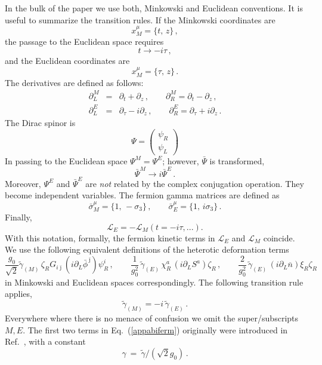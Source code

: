 \documentclass[epsfig,12pt]{article}
\def\beq{\begin{equation}}
\def\eeq{\end{equation}}
\def\beqn{\begin{eqnarray}}
\def\eeqn{\end{eqnarray}}
\newcommand{\cell}{{\mathcal L}}
\newcommand{\pt}{\partial}
\def\beqn{\begin{eqnarray}}
\def\eeqn{\end{eqnarray}}
\def\beq{\begin{equation}}
\def\eeq{\end{equation}}
\newcommand{\p}{\partial}
\newcommand{\wt}{\widetilde}
\newcommand{\ov}{\overline}
\newcommand{\bj}{{\bar \jmath}}
\newcommand{\ssm}{{\scriptscriptstyle(M)}}
\newcommand{\sse}{{\scriptscriptstyle(E)}}
\begin{document}
{In the bulk of the paper we use both, Minkowski and Euclidean conventions.
It is useful to summarize the transition rules.
If the Minkowski coordinates are
\beq
x^\mu_M =\{t,\,z\}\,,
\label{appeone}
\eeq
the passage to the Euclidean space requires
\beq
t \to - i\tau\,,
\label{appe2}
\eeq
and the Euclidean coordinates are
\beq
x^\mu_M =\{\tau,\,z\}\,.
\label{appe3}
\eeq
The derivatives are defined as follows:
\beqn
\pt_L^M &=& \pt_t+\pt_z\,,\qquad \pt_R^M = \pt_t- \pt_z\,,
\nonumber\\[2mm]
\pt_L^E &=& \pt_\tau - i \pt_z\,,\qquad \pt_R^E = \pt_\tau + i \pt_z\,.
\label{appe4}
\eeqn
The Dirac spinor is
\beq
\Psi =\left(
\begin{array}{c}
\psi_R\\[1mm]
\psi_L
\end{array}
\right)
\label{appe5}
\eeq
In passing to the Euclidean space $\Psi^M = \Psi^E$;
however, $\bar\Psi$ is transformed,
\beq
\bar\Psi^M \to i \bar \Psi^E\,.
\label{appe6}
\eeq
Moreover, $\Psi^E$ and $\bar \Psi^E$ are {\em not} related by the complex conjugation operation.
They become independent variables. The fermion gamma matrices are defined as
\beq
\bar\sigma^\mu_M =\{1,\,-\sigma_3\}\,,\qquad \bar\sigma^\mu_E =\{1,\, i\sigma_3\}\,.
\label{appe7}
\eeq
Finally, 
\beq
\cell_E =- \cell_M (t=-i\tau , ...).
\eeq
With this notation, formally, the fermion kinetic terms in $\cell_E $ and $\cell_M $
coincide.
We use the following equivalent definitions of the heterotic deformation terms
\beq
 \frac{g_0}{\sqrt 2} \tilde{\gamma}_\ssm\, \zeta_R G_{i\bj}\left(i\pt_L\bar\phi^{\,\bj}\right)\psi_R^i\,, 
\qquad
  \frac{1}{g_0^2}\, \wt{\gamma}_\sse\, \chi_R^a\, (i\p_L S^a) \zeta_R\,,
\qquad
  \frac{2}{g_0^2}\, \wt{\gamma}_\sse\, (i\p_L \ov{n}) \xi_R \zeta_R\,
\label{appabiferm}
\eeq
in Minkowski and Euclidean spaces correspondingly. 
The following transition rule applies,
\beq
\wt{\gamma}_\ssm = - i\,\wt\gamma_\sse\,.
\label{appe8}
\eeq
Everywhere where there is no menace of confusion we omit the super/sub\-scripts $M,E$.
The first two terms in Eq.~(\ref{appabiferm}) originally were introduced in Ref.~\cite{SY1}, with 
a constant
\beq
	\gamma ~=~ \wt\gamma / (\sqrt{2}g_0) \,.
\eeq


}
\end{document}
